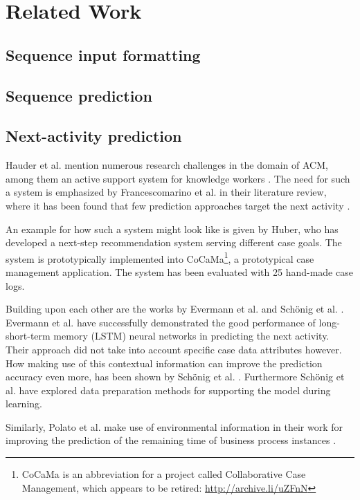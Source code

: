 \chapter{Related Work}\label{chap:related-work}


\section{Sequence input formatting}
\section{Sequence prediction}
\section{Next-activity prediction}
Hauder et al. mention numerous research challenges in the domain of ACM, among them an active support system for knowledge workers \cite{hauder2014}.
The need for such a system is emphasized by Francescomarino et al. in their literature review, where it has been found that few prediction approaches target the next activity \cite{francescomarino2018}.

An example for how such a system might look like is given by Huber, who has developed a next-step recommendation system serving different case goals.
The system is prototypically implemented into CoCaMa\footnote{CoCaMa is an abbreviation for a project called Collaborative Case Management, which appears to be retired: \url{http://archive.li/uZFnN}}, a prototypical case management application. The system has been evaluated with 25 hand-made case logs.

Building upon each other are the works by Evermann et al. \cite{evermann2016} and Schönig et al. \cite{schoenig2018}.
Evermann et al. have successfully demonstrated the good performance of long-short-term memory (LSTM) neural networks in predicting the next activity.
Their approach did not take into account specific case data attributes however.
How making use of this contextual information can improve the prediction accuracy even more, has been shown by Schönig et al. \cite{schoenig2018}.
Furthermore Schönig et al. have explored data preparation methods for supporting the model during learning.

Similarly, Polato et al. make use of environmental information in their work for improving the prediction of the remaining time of business process instances \cite{polato2014}.

